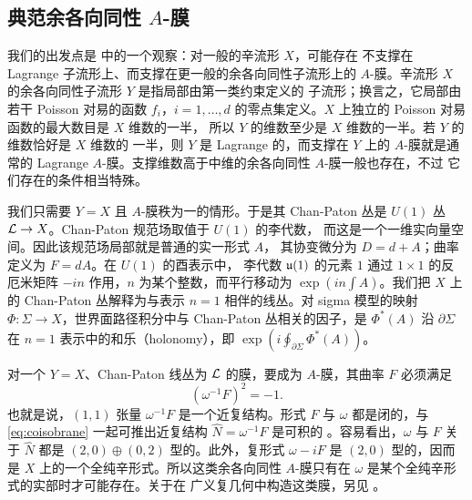 
\subsection{典范余各向同性 $A$-膜}

我们的出发点是 \cite{ref80} 中的一个观察：对一般的辛流形 $X$，可能存在
不支撑在 Lagrange 子流形上、而支撑在更一般的余各向同性子流形上的
$A$-膜。辛流形 $X$ 的余各向同性子流形 $Y$ 是指局部由第一类约束定义的
子流形；换言之，它局部由若干 Poisson 对易的函数 $f_i$，$i=1,\dots,d$
的零点集定义。$X$ 上独立的 Poisson 对易函数的最大数目是 $X$ 维数的一半，
所以 $Y$ 的维数至少是 $X$ 维数的一半。若 $Y$ 的维数恰好是 $X$ 维数的
一半，则 $Y$ 是 Lagrange 的，而支撑在 $Y$ 上的 $A$-膜就是通常的
Lagrange $A$-膜。支撑维数高于中维的余各向同性 $A$-膜一般也存在，不过
它们存在的条件相当特殊。

我们只需要 $Y=X$ 且 $A$-膜秩为一的情形。于是其 Chan-Paton 丛是
$U(1)$ 丛 ${\cal L}\to X$。Chan-Paton 规范场取值于 $U(1)$ 的李代数，
而这是一个一维实向量空间。因此该规范场局部就是普通的实一形式 $A$，
其协变微分为 $D=d+A$；曲率定义为 $F=dA$。在 $U(1)$ 的酉表示中，
李代数 $\frak{u}(1)$ 的元素 $1$ 通过 $1\times 1$ 的反厄米矩阵 $-in$
作用，$n$ 为某个整数，而平行移动为 $\exp(in\int A)$。我们把 $X$ 上的
Chan-Paton 丛解释为与表示 $n=1$ 相伴的线丛。对 sigma 模型的映射
$\Phi:\Sigma\to X$，世界面路径积分中与 Chan-Paton 丛相关的因子，是
$\Phi^*(A)$ 沿 $\partial\Sigma$ 在 $n=1$ 表示中的和乐（holonomy），即
$\exp(i\oint_{\partial\Sigma}\Phi^*(A))$。

对一个 $Y=X$、Chan-Paton 线丛为 ${\cal L}$ 的膜，要成为 $A$-膜，其曲率
$F$ 必须满足
\setcounter{equation}{0}
\begin{equation}\label{eq:coisobrane}
(\omega^{-1}F)^2=-1.
\end{equation}
 也就是说，$(1,1)$ 张量 $\omega^{-1}F$ 是一个近复结构。形式 $F$ 与
$\omega$ 都是闭的，与 \eqref{eq:coisobrane} 一起可推出近复结构
$\hat N=\omega^{-1}F$ 是可积的 \cite{ref80}。容易看出，$\omega$ 与 $F$
关于 $\hat N$ 都是 $(2,0)\oplus(0,2)$ 型的。此外，复形式 $\omega-iF$
是 $(2,0)$ 型的，因而是 $X$ 上的一个全纯辛形式。所以这类余各向同性
$A$-膜只有在 $\omega$ 是某个全纯辛形式的实部时才可能存在。关于在
广义复几何中构造这类膜，另见 \cite{ref67}。

